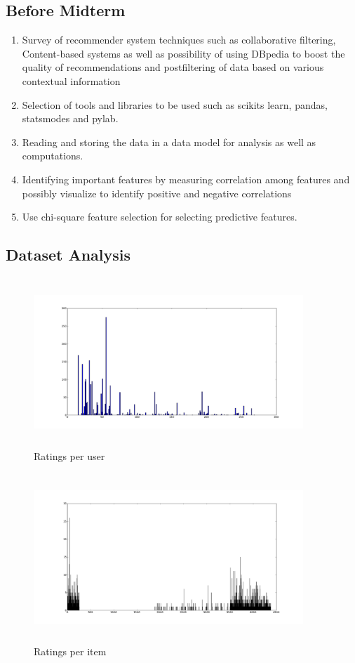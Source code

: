 \documentclass{article}
\begin{document}
\subsection{Before Midterm}
\begin{enumerate}
\item Survey of recommender system techniques such as collaborative filtering, Content-based systems  as well as possibility of using DBpedia to boost  the quality of recommendations\cite{ostuni2012cinemappy} and postfiltering of data based on various contextual information
\item Selection of tools and libraries to be used such as scikits learn, pandas, statsmodes and pylab.
\item Reading and storing the data in a data model for analysis as well as computations.
\item Identifying important features by measuring correlation among features and possibly visualize to identify positive and negative correlations
\item Use chi-square feature selection for  selecting predictive features.
\end{enumerate}

\subsection{Dataset Analysis}

\begin{figure}[H]
\centering
\includegraphics[height=2.5in, width=4in]{ratingsperuser.png}
\caption{Ratings per user}
\label{ruser}
\end{figure}

\begin{figure}[H]
\centering
\includegraphics[height=2.5in, width=4in]{ratungspermovie.png}
\caption{Ratings per item}
\label{ritem}
\end{figure}



\end{document}
